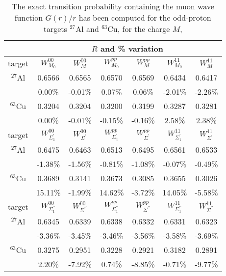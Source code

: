 \documentclass{book}[12pt]
\begin{document}
\begin{table}
\centering
 \begin{tabular}{|c|c|c|c|c|c|c|}
 \hline
 \rule{0cm}{0.4cm}
 &  \multicolumn{5}{c}{~~~~~~~$R$ and \% variation}  &\\[0.15cm]
\hline
\rule{0cm}{0.5cm}
 target & $W_{M_0}^{00}$ & $W_M^{00}$ & $W_{M_0}^{pp}$ & $W_M^{pp}$ & $W_{M_0}^{11}$ & $W_M^{11}$ \\[0.15cm]
 \hline
 \rule{0cm}{0.4cm}
 $^{27}$Al & 0.6566 & 0.6565 & 0.6570 & 0.6569  & 0.6434 & 0.6417  \\
  & 0.00\% & -0.01\% & 0.07\% & 0.06\% &  -2.01\% & -2.26\% \\
 \rule{0cm}{0.4cm}
  $^{63}$Cu & 0.3204 & 0.3204 & 0.3200 & 0.3199 & 0.3287 & 0.3281  \\
  & 0.00\% & -0.01\% & -0.15\% & -0.16\%   & 2.58\% & 2.38\% \\ [.15cm]
 \hline
\rule{0cm}{0.5cm}
 target & $W_{\Sigma^\prime_1}^{00}$ & $W_{\Sigma^\prime}^{00}$ & $W_{\Sigma^\prime_1}^{pp}$ & $W_{\Sigma^\prime}^{pp}$ &  $W_{\Sigma^\prime_1}^{11}$ & $W_{\Sigma^\prime}^{11}$ \\[0.15cm]
 \hline
 \rule{0cm}{0.4cm}
 $^{27}$Al & 0.6475 & 0.6463 & 0.6513 & 0.6495 & 0.6561 & 0.6533 \\
  & -1.38\% & -1.56\% & -0.81\% & -1.08\% &  -0.07\% & -0.49\% \\
 \rule{0cm}{0.4cm}
  $^{63}$Cu & 0.3689 & 0.3141 & 0.3673 & 0.3085 &  0.3655 &  0.3026 \\
  & 15.11\% & -1.99\% & 14.62\% & -3.72\% & 14.05\% &  -5.58\% \\ [.15cm]
  \hline
\rule{0cm}{0.5cm}
 target & $W_{\Sigma^{\prime \prime}_1}^{00}$ & $W_{\Sigma^{\prime \prime}}^{00}$ & $W_{\Sigma^{\prime \prime}_1}^{pp}$ & $W_{\Sigma^{\prime \prime}}^{pp}$ & $W_{\Sigma^{\prime \prime}_1}^{11}$ & $W_{\Sigma^{\prime \prime}}^{11}$ \\[0.15cm]
 \hline
 \rule{0cm}{0.4cm}
 $^{27}$Al & 0.6345 & 0.6339 & 0.6338 & 0.6332 &  0.6331 &  0.6323 \\
  & -3.36\% & -3.45\% & -3.46\% & -3.56\% & -3.58\% & -3.69\% \\
 \rule{0cm}{0.4cm}
  $^{63}$Cu & 0.3275 & 0.2951 & 0.3228 & 0.2921 & 0.3182 & 0.2891  \\
  & 2.20\% & -7.92\% & 0.74\% & -8.85\% & -0.71\% & -9.77\% \\ [.15cm]
  \hline
 \end{tabular}
  \caption{ \label{tab:average1} The exact transition probability containing the muon wave function $G(r)/r$ has been computed for the odd-proton targets $^{27}$Al and $^{63}$Cu, for the charge $M$,
}
\end{table}
\end{document}
